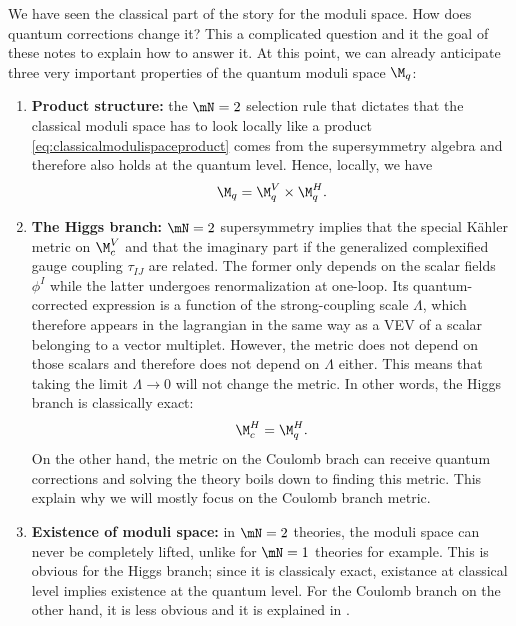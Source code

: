 \documentclass{worksheetclass}
\begin{document}
        We have seen the classical part of the story for the moduli space. How does quantum corrections change it? This a complicated question and it the goal of these notes to explain how to answer it. At this point, we can already anticipate three very important properties of the quantum moduli space $\M_q$:
        \begin{enumerate}
            \item \textbf{Product structure:} the $\mN=2$ selection rule that dictates that the classical moduli space has to look locally like a product \eqref{eq:classicalmodulispaceproduct} comes from the supersymmetry algebra and therefore also holds at the quantum level. Hence, locally, we have
            \begin{equation}
                \M_q = \M^V_{q}\times\M^H_{q}.\label{eq:quantummodulispaceproduct}
            \end{equation}
            \item \textbf{The Higgs branch:} $\mN=2$ supersymmetry implies that the special Kähler metric on $\M^V_{c}$ and that the imaginary part if the generalized complexified gauge coupling $\tau_{IJ}$ are related. The former only depends on the scalar fields $\phi^I$ while the latter undergoes renormalization at one-loop. Its quantum-corrected expression is a function of the strong-coupling scale $\Lambda$, which therefore appears in the lagrangian in the same way as a VEV of a scalar belonging to a vector multiplet. However, the metric does not depend on those scalars and therefore does not depend on $\Lambda$ either. This means that taking the limit $\Lambda\to0$ will not change the metric. In other words, the Higgs branch is classically exact:
            \begin{equation}
                \M^H_{c}=\M^H_{q}.
            \end{equation}
            On the other hand, the metric on the Coulomb brach can receive quantum corrections and solving the theory boils down to finding this metric. This explain why we will mostly focus on the Coulomb branch metric.
            \item \textbf{Existence of moduli space:} in $\mN=2$ theories, the moduli space can never be completely lifted, unlike for $\mN=1$ theories for example. This is obvious for the Higgs branch; since it is classicaly exact, existance at classical level implies existence at the quantum level. For the Coulomb branch on the other hand, it is less obvious and it is explained in \cite[p. 282]{bertolinisusy}.
        \end{enumerate}
\end{document}
